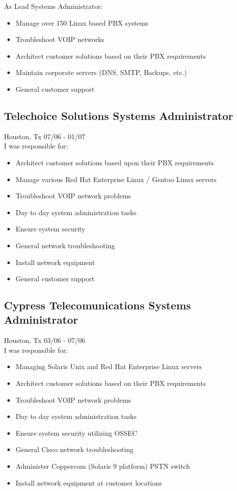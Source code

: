\documentclass{article}
\begin{document}
  As Lead Systems Administrator:\\
  \begin{itemize}
  \item Manage over 150 Linux based PBX systems
  \item Troubleshoot VOIP networks
  \item Architect customer solutions based on their PBX requirements
  \item Maintain corporate servers (DNS, SMTP, Backups, etc.)
  \item General customer support
  \end{itemize}

  \subsection{Telechoice Solutions \hfill Systems Administrator}
  Houston, Tx \hfill 07/06 - 01/07\\
  I was responsible for:\\
  \begin{itemize}
  \item Architect customer solutions based upon their PBX requirements
  \item Manage various Red Hat Enterprise Linux / Gentoo Linux servers
  \item Troubleshoot VOIP network problems
  \item Day to day system administration tasks
  \item Ensure system security
  \item General network troubleshooting
  \item Install network equipment
  \item General customer support
  \end{itemize}

  \subsection{Cypress Telecomunications \hfill Systems Administrator}
  Houston, Tx \hfill 03/06 - 07/06\\
  I was responsible for:\\
  \begin{itemize}
  \item Managing Solaris Unix and Red Hat Enterprise Linux servers
  \item Architect customer solutions based on their PBX requirements
  \item Troubleshoot VOIP network problems
  \item Day to day system administration tasks
  \item Ensure system security utilizing OSSEC
  \item General Cisco network troubleshooting
  \item Administer Coppercom (Solaris 9 platform) PSTN switch
  \item Install network equipment at customer locations
  \end{itemize}
  
\end{document}
